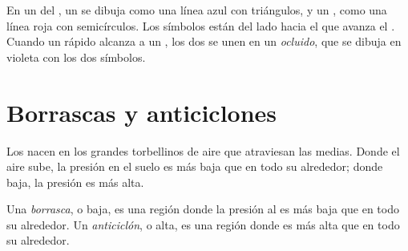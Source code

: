 En un  del , un  se dibuja como una línea azul con
triángulos, y un , como una línea roja con semicírculos. Los
símbolos están del lado hacia el que avanza el . Cuando un  rápido alcanza a un , los dos se unen en un \emph{
ocluido}, que se dibuja en violeta con los dos símbolos.

\section{Borrascas y anticiclones}

Los  nacen en los grandes torbellinos de aire que atraviesan las
 medias. Donde el aire sube, la presión en el suelo es más baja
que en todo su alrededor; donde baja, la presión es más alta.

\begin{definition}\label{def:g8:fronts-and-weather-maps:depression}
Una \emph{borrasca}, o baja, es una región donde la presión
al  es más baja que en todo su alrededor. Un
\emph{anticiclón}, o alta, es una región donde
es más alta que en todo su alrededor.
\end{definition}
\label{def:g8:fronts-and-weather-maps:anticyclone}


